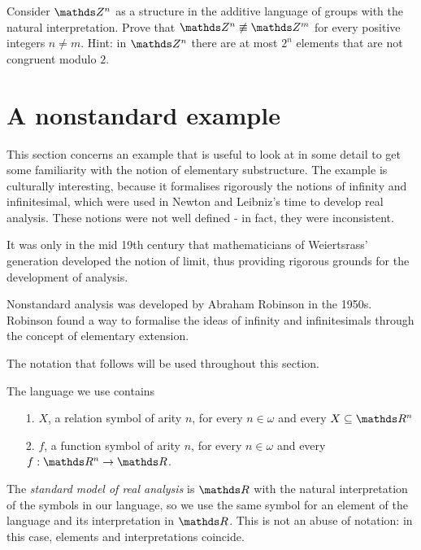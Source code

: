 \begin{exercise}\label{ex_Z^nZ^m_nonelementary}
Consider $\ZZ^n$ as a structure in the additive language of groups with the natural interpretation.
Prove that $\ZZ^n\not\equiv\ZZ^m$ for every positive integers $n\neq m$.
Hint: in $\ZZ^n$ there are at most $2^n$ elements that are not congruent modulo $2$.
\end{exercise}


\section{A nonstandard example}
\label{nonstandard}
\def\nsR{{}^*\kern-.2ex\RR}
\def\nsN{{}^*\kern-.2ex\NN}
\def\nsQ{{}^*\kern-.2ex\QQ}
\def\ns{{}^*\kern-.2ex}
\def\st{{\rm st}}

This section concerns an example that is useful to look at in some detail to get some familiarity with the notion of elementary substructure.
The example is culturally interesting, because it formalises rigorously the notions of infinity and infinitesimal, which were used in Newton and Leibniz's time to develop real analysis.
These notions were not well defined - in fact, they were inconsistent.

It was only in the mid 19th century that mathematicians of Weiertsrass' generation developed the notion of limit, thus providing rigorous grounds for the development of analysis.

Nonstandard analysis was developed by Abraham Robinson in the 1950s.
Robinson found a way to formalise the ideas of infinity and infinitesimals through the concept of elementary extension.

The notation that follows will be used throughout this section.

The language we use contains
\begin{itemize}
\item[1.] $X$, a relation symbol of arity $n$, for every $n\in\omega$ and every $X\subseteq \RR^n$
\item[2.] $f$, a function symbol of arity $n$, for every $n\in\omega$ and every  $f:\RR^n\imp\RR$.
\end{itemize}
The \emph{standard model of real analysis} is $\RR$ with the natural interpretation of the symbols in our language, so we use the same symbol for an element of the language and its interpretation in $\RR$.
This is not an abuse of notation: in this case, elements and interpretations coincide.

